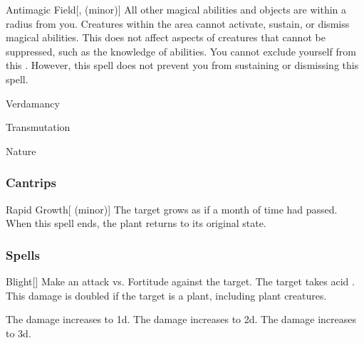 \lowercase{\hypertarget{spell:Antimagic Field}{}}\label{spell:Antimagic Field}
\begin{freeability}[Rank 8]{\hypertarget{spell:Antimagic Field}{Antimagic Field}}[,  (minor)]
All other magical abilities and objects are  within a \areamed radius  from you.
Creatures within the area cannot activate, sustain, or dismiss magical abilities.
This does not affect aspects of creatures that cannot be suppressed, such as the knowledge of abilities.
You cannot exclude yourself from this .
However, this spell does not prevent you from sustaining or dismissing this spell.
\end{freeability}
\vspace{0.25em}


\newpage
\begin{spellsection}{Verdamancy}

\begin{spellheader}
\end{spellheader}


 Transmutation

 Nature

\subsubsection{Cantrips}


\begin{freeability}{Rapid Growth}[ (minor)]
The target grows as if a month of time had passed.
When this spell ends, the plant returns to its original state.
\end{freeability}

\end{spellsection}


\subsubsection{Spells}


\lowercase{\hypertarget{spell:Blight}{}}\label{spell:Blight}
\begin{freeability}[Rank 1]{\hypertarget{spell:Blight}{Blight}}[]
Make an attack vs. Fortitude against the target.
\hit The target takes acid .
This damage is doubled if the target is a plant, including plant creatures.

\rankline
{} The damage increases to  \plus1d.
 The damage increases to  \plus2d.
 The damage increases to  \plus3d.
\end{freeability}
\vspace{0.25em}



